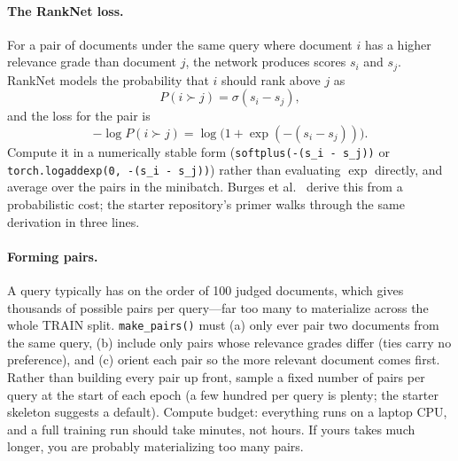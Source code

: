 \documentclass[10pt]{article}
\begin{document}
\paragraph{The RankNet loss.}
For a pair of documents under the same query where document \(i\) has a higher relevance grade than document \(j\), the network produces scores \(s_i\) and \(s_j\). RankNet models the probability that \(i\) should rank above \(j\) as
\[
P(i \succ j) = \sigma(s_i - s_j),
\]
and the loss for the pair is
\[
-\log P(i \succ j) = \log\bigl(1 + \exp(-(s_i - s_j))\bigr).
\]
Compute it in a numerically stable form (\texttt{softplus(-(s\_i - s\_j))} or \texttt{torch.logaddexp(0, -(s\_i - s\_j))}) rather than evaluating \(\exp\) directly, and average over the pairs in the minibatch. Burges et al.~\cite{burges2005} derive this from a probabilistic cost; the starter repository's primer walks through the same derivation in three lines.

\paragraph{Forming pairs.}
A query typically has on the order of 100 judged documents, which gives thousands of possible pairs per query---far too many to materialize across the whole TRAIN split. \texttt{make\_pairs()} must (a) only ever pair two documents from the same query, (b) include only pairs whose relevance grades differ (ties carry no preference), and (c) orient each pair so the more relevant document comes first. Rather than building every pair up front, sample a fixed number of pairs per query at the start of each epoch (a few hundred per query is plenty; the starter skeleton suggests a default). Compute budget: everything runs on a laptop CPU, and a full training run should take minutes, not hours. If yours takes much longer, you are probably materializing too many pairs.
\end{document}

